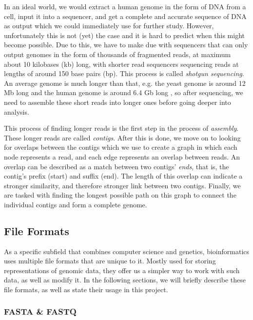 \documentclass[times, utf8, diplomski, english]{fer_eng}
\begin{document}
In an ideal world, we would extract a human genome in the form of DNA from a cell, input it into a sequencer, and get a complete and accurate sequence of DNA as output which we could immediately use for further study. However, unfortunately this is not (yet) the case and it is hard to predict when this might become possible. Due to this, we have to make due with sequencers that can only output genomes in the form of thousands of fragmented reads, at maximum about 10 kilobases (kb) long, with shorter read sequencers sequencing reads at lengths of around 150 base pairs (bp). This process is called \textit{shotgun sequencing}. An average genome is much longer than that, e.g. the yeast genome is around 12 Mb long \cite{yeast} and the human genome is around 6.4 Gb long \cite{human}, so after sequencing, we need to assemble these short reads into longer ones before going deeper into analysis.

This process of finding longer reads is the first step in the process of \textit{assembly}. These longer reads are called \textit{contigs}. After this is done, we move on to looking for overlaps between the contigs which we use to create a graph in which each node represents a read, and each edge represents an overlap between reads. An overlap can be described as a match between two contigs' \textit{ends}, that is, the contig's prefix (start) and suffix (end). The length of this overlap can indicate a stronger similarity, and therefore stronger link between two contigs. Finally, we are tasked with finding the longest possible path on this graph to connect the individual contigs and form a complete genome.


\subsection{File Formats}
\label{subsec:file formats}

As a specific subfield that combines computer science and genetics, bioinformatics uses multiple file formats that are unique to it. Mostly used for storing representations of genomic data, they offer us a simpler way to work with such data, as well as modify it. In the following sections, we will briefly describe these file formats, as well as state their usage in this project.

\subsubsection{FASTA \& FASTQ}
\label{subsubsec:fasta and fastq}
\end{document}
